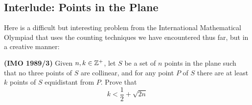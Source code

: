 \label{05-0207-2}

% 






% 




\subsection{Interlude: Points in the Plane}
Here is a difficult but interesting problem from the International Mathematical Olympiad that uses the counting techniques we have encountered thus far, but in a creative manner:

\begin{problem}{1} 
\textbf{(IMO 1989/3)} Given $n, k \in \mathbb{Z}^+$, let $S$ be a set of $n$ points in the plane such that no three points of $S$ are collinear, and for any point $P$ of $S$ there are at least $k$ points of $S$ equidistant from $P$. Prove that 
\[
	k < \frac{1}{2} + \sqrt{2n}
\]
\end{problem}

